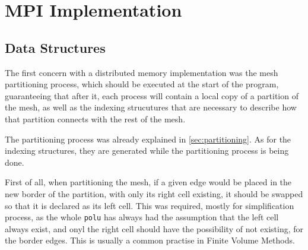 \section{MPI Implementation}
\label{sec:implementation}

\subsection{Data Structures}
\label{subsec:structs}

The first concern with a distributed memory implementation was the mesh partitioning process, which should be executed at the start of the program, guaranteeing that after it, each process will contain a local copy of a partition of the mesh, as well as the indexing strucutures that are necessary to describe how that partition connects with the rest of the mesh.

The partitioning process was already explained in \cref{sec:partitioning}. As for the indexing structures, they are generated while the partitioning process is being done.

First of all, when partitioning the mesh, if a given edge would be placed in the new border of the partition, with only its right cell existing, it should be swapped so that it is declared as its left cell. This was required, mostly for simplification process, as the whole \texttt{polu} has always had the assumption that the left cell always exist, and onyl the right cell should have the possibility of not existing, for the border edges. This is usually a common practise in Finite Volume Methods.

